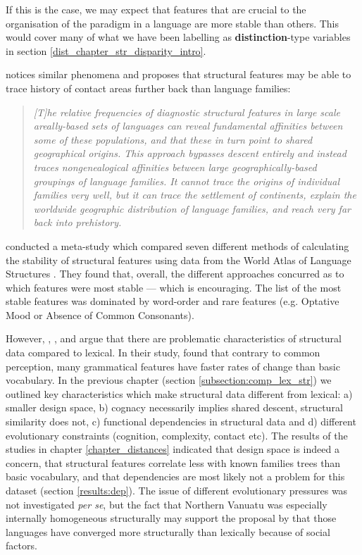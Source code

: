 \documentclass[draft,10pt]{article} %
\begin{document}
If this is the case, we may expect that features that are crucial to the organisation of the paradigm in a language are more stable than others. This would cover many of what we have been labelling as \textbf{distinction}-type variables in section \ref{dist_chapter_str_disparity_intro}.

\citet[143]{nichols1998origin} notices similar phenomena and proposes that structural features may be able to trace history of contact areas further back than language families:

\begin{quotation}
\noindent\emph{[T]he relative frequencies of diagnostic structural features in large scale areally-based sets of languages can reveal fundamental affinities between some of these populations, and that these in turn point to shared geographical origins. This approach bypasses descent entirely and instead traces nongenealogical affinities between large geographically-based groupings of language families. It cannot trace the origins of individual families very well, but it can trace the settlement of continents, explain the worldwide geographic distribution of language families, and reach very far back into prehistory.}
\end{quotation}
\begin{flushright} \citep[143]{nichols1998origin} \end{flushright}

\citet{dediu2013some} conducted a meta-study which compared seven different methods of calculating the stability of structural features using data from the World Atlas of Language Structures \citep{wals}. They found that, overall, the different approaches concurred as to which features were most stable --- which is encouraging. The list of the most stable features was dominated by word-order and rare features (e.g. Optative Mood or Absence of Common Consonants). 

However, \citet{thomason1992language}, \citet{ross1996contact}, and \citet{greenhilletal_2017} argue that there are problematic characteristics of structural data compared to lexical. In their study, \citep{greenhilletal_2017} found that contrary to common perception, many grammatical features have faster rates of change than basic vocabulary. In the previous chapter (section \ref{subsection:comp_lex_str}) we outlined key characteristics which make structural data different from lexical: a) smaller design space, b) cognacy necessarily implies shared descent, structural similarity does not, c) functional dependencies in structural data and d) different evolutionary constraints (cognition, complexity, contact etc). The results of the studies in chapter \ref{chapter_distances} indicated that design space is indeed a concern, that structural features correlate less with known families trees than basic vocabulary, and that dependencies are most likely not a problem for this dataset (section \ref{results:dep}). The issue of different evolutionary pressures was not investigated \emph{per se}, but the fact that Northern Vanuatu was especially internally homogeneous structurally may support the proposal by \cite{francois2011} that those languages have converged more structurally than lexically because of social factors.
\end{document}
